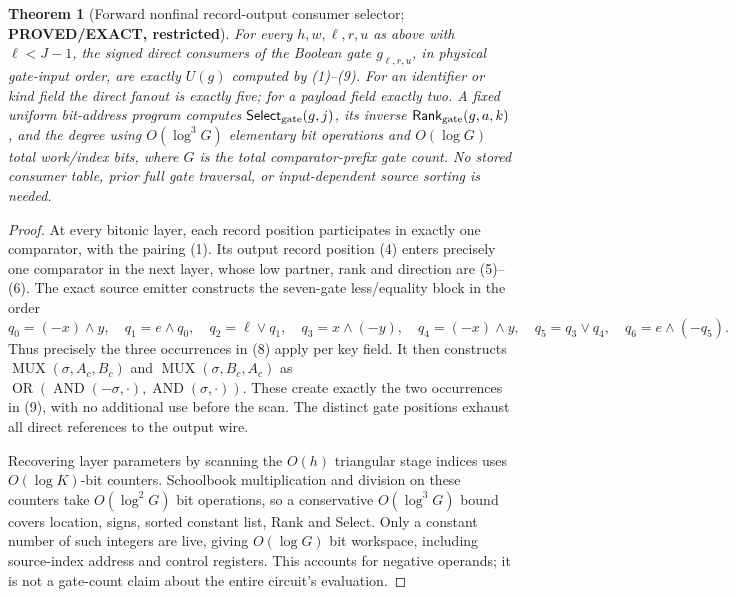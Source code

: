 \documentclass[11pt]{article}
\newtheorem{theorem}{Theorem}
\newcommand{\Select}{\mathsf{Select}}
\newcommand{\Rank}{\mathsf{Rank}}
\begin{document}
\begin{theorem}[Forward nonfinal record-output consumer selector;
\textbf{PROVED/EXACT, restricted}]\label{th:sel}
For every $h,w,\ell,r,u$ as above with $\ell<J-1$, the
signed direct consumers of the Boolean gate
$g_{\ell,r,u}$, in physical gate-input order, are
\emph{exactly} $U(g)$ computed by (1)--(9).
For an identifier or kind field the direct fanout is exactly
five; for a payload field exactly two. A fixed uniform
bit-address program computes $\Select_{\rm gate}(g,j)$,
its inverse $\Rank_{\rm gate}(g,a,k)$, and the degree using
$O(\log^3 G)$ elementary bit operations and
$O(\log G)$ total work/index bits, where $G$ is the
total comparator-prefix gate count.  No stored consumer table,
prior full gate traversal, or input-dependent source sorting
is needed.
\end{theorem}
\begin{proof}
At every bitonic layer, each record position participates in
exactly one comparator, with the pairing (1).  Its output
record position (4) enters precisely one comparator in the
next layer, whose low partner, rank and direction are (5)--(6).
The exact source emitter constructs the seven-gate
less/equality block in the order
\[
 q_0=(-x)\wedge y,\quad q_1=e\wedge q_0,\quad
 q_2=\ell\vee q_1,\quad
 q_3=x\wedge(-y),\quad q_4=(-x)\wedge y,\quad
 q_5=q_3\vee q_4,\quad q_6=e\wedge(-q_5).
\]
Thus precisely the three occurrences in (8) apply per
key field.  It then constructs
$\operatorname{MUX}(\sigma,A_c,B_c)$ and
$\operatorname{MUX}(\sigma,B_c,A_c)$ as
$\operatorname{OR}(\operatorname{AND}(-\sigma,\cdot),
\operatorname{AND}(\sigma,\cdot))$. These create exactly the
two occurrences in (9), with no additional use before the
scan. The distinct gate positions exhaust all direct
references to the output wire.

Recovering layer parameters by scanning the $O(h)$
triangular stage indices uses $O(\log K)$-bit counters.
Schoolbook multiplication and division on these counters
take $O(\log^2 G)$ bit operations, so a conservative
$O(\log^3G)$ bound covers location, signs, sorted constant
list, Rank and Select.  Only a constant number of such
integers are live, giving $O(\log G)$ bit workspace,
including source-index address and control registers.
This accounts for negative operands; it is not a gate-count
claim about the entire circuit's evaluation.
\end{proof}
\end{document}
